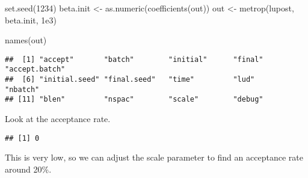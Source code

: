 \documentclass[
]{article}
\newenvironment{Shaded}{\begin{snugshade}}{\end{snugshade}}
\newcommand{\AttributeTok}[1]{\textcolor[rgb]{0.77,0.63,0.00}{#1}}
\newcommand{\CommentTok}[1]{\textcolor[rgb]{0.56,0.35,0.01}{\textit{#1}}}
\newcommand{\DecValTok}[1]{\textcolor[rgb]{0.00,0.00,0.81}{#1}}
\newcommand{\FloatTok}[1]{\textcolor[rgb]{0.00,0.00,0.81}{#1}}
\newcommand{\FunctionTok}[1]{\textcolor[rgb]{0.00,0.00,0.00}{#1}}
\newcommand{\NormalTok}[1]{#1}
\newcommand{\OtherTok}[1]{\textcolor[rgb]{0.56,0.35,0.01}{#1}}
\newcommand{\SpecialCharTok}[1]{\textcolor[rgb]{0.00,0.00,0.00}{#1}}
\begin{document}
\begin{Shaded}
\begin{Highlighting}[]
\FunctionTok{set.seed}\NormalTok{(}\DecValTok{1234}\NormalTok{)}
\NormalTok{beta.init }\OtherTok{\textless{}{-}} \FunctionTok{as.numeric}\NormalTok{(}\FunctionTok{coefficients}\NormalTok{(out))}
\NormalTok{out }\OtherTok{\textless{}{-}} \FunctionTok{metrop}\NormalTok{(lupost, beta.init, }\FloatTok{1e3}\NormalTok{)}

\FunctionTok{names}\NormalTok{(out)}
\end{Highlighting}
\end{Shaded}

\begin{verbatim}
##  [1] "accept"       "batch"        "initial"      "final"        "accept.batch"
##  [6] "initial.seed" "final.seed"   "time"         "lud"          "nbatch"      
## [11] "blen"         "nspac"        "scale"        "debug"
\end{verbatim}

Look at the acceptance rate.

\begin{Shaded}
\end{Shaded}

\begin{verbatim}
## [1] 0
\end{verbatim}

This is very low, so we can adjust the scale parameter to find an
acceptance rate around 20\%.

\begin{Shaded}
\end{Shaded}
\end{document}
